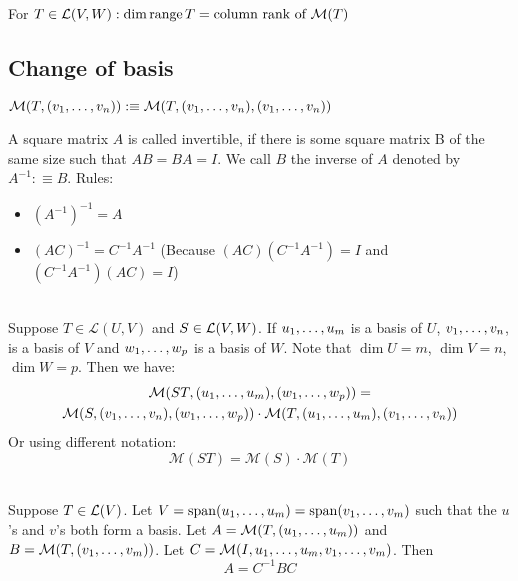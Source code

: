 \setcounter{thm}{77}
\begin{thm}
    For $T \in {\mathcal{L}(V,W)}: \dim \operatorname{range} T = \text{column rank of } \mathcal{M} (T)$
\end{thm}

\subsection{Change of basis}

\begin{mydef-non}
    $\mathcal{M}(T, (v_1, \dots, v_n)) :\equiv \mathcal{M}(T, (v_1, \dots, v_n),(v_1, \dots, v_n))$
\end{mydef-non}

\setcounter{thm}{79}
\begin{thm}
    A square matrix $A$ is called invertible, if there is some square matrix B of the same size such that $AB=BA=I$. We call $B$ the inverse of $A$ denoted by $A^{-1} :\equiv B$. Rules: 
    \begin{itemize}
    	\item $(A^{-1})^{-1}=A$
    	\item $(AC)^{-1} = C^{-1}A^{-1}$ (Because $(AC)(C^{-1}A^{-1})=I$ and $(C^{-1}A^{-1})(AC)=I$)
    \end{itemize}
\end{thm}

\begin{thm}
     \\
    Suppose $T\in \mathcal{L}(U,V)$ and $S\in {\mathcal{L}(V,W)}$. If $u_1, \dots, u_m$ is a basis of $U$, $v_1, \dots, v_n$, is a basis of $V$ and $w_1, \dots, w_{p}$ is a basis of $W$. Note that $\dim U = m$, $\dim V = n$, $\dim W = p$. Then we have: 
    \begin{multline}
    	\mathcal{M}(ST, (u_1, \dots, u_m), (w_1, \dots, w_{p})) = \\
    	\mathcal{M}(S, (v_1, \dots, v_n), (w_1, \dots, w_{p} )) \cdot
    	\mathcal{M}(T, (u_1, \dots, u_m), (v_1, \dots, v_n   ))
    \end{multline}
    Or using different notation:
    \begin{equation}
        \mathcal{M}(ST) = \mathcal{M}(S) \cdot \mathcal{M}(T)
    \end{equation}
\end{thm}

\setcounter{thm}{83}
\begin{thm}
    \\ 
    Suppose $T \in \mathcal{L}(V)$. Let 
    $V = \operatorname{span} (u_1, \dots, u_m) = \operatorname{span} (v_1, \dots, v_m)$ such that the $u$'s and $v$'s both form a basis. Let $A=\mathcal{M}(T, (u_1, \dots, u_m))$ and $B=\mathcal{M}(T,(v_1, \dots, v_m))$. Let  
    $C=\mathcal{M}(I, u_1, \dots, u_m, v_1, \dots, v_m)$. Then
    \begin {equation}
        A = C^{-1} B C
    \end {equation} 
\end{thm}

